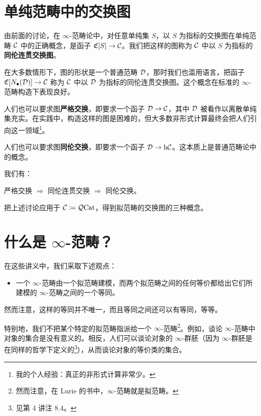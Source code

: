 \section{单纯范畴中的交换图}

\nitem\label{L5-8.1} 由前面的讨论，在 $\infty$-范畴论中，对任意单纯集 $S$，以 $S$ 为指标的交换图在单纯范畴 $\mathcal{C}$ 中的正确概念，是函子 $\mathfrak{C}[S]\to\mathcal{C}$。我们把这样的图称为 $\mathcal{C}$ 中以 $S$ 为指标的\textbf{同伦连贯交换图}。

\nitem\label{L5-8.2} 在大多数情形下，图的形状是一个普通范畴 $\mathcal{D}$，那时我们也滥用语言，把函子 $\mathfrak{C}[N_{\bullet}(\mathcal{D})]\to\mathcal{C}$ 称为 $\mathcal{C}$ 中以 $\mathcal{D}$ 为指标的同伦连贯交换图。这个概念在标准的 $\infty$-范畴构造下表现良好。

人们也可以要求图\textbf{严格交换}，即要求一个函子 $\mathcal{D}\to\mathcal{C}$，其中 $\mathcal{D}$ 被看作以离散单纯集充实。在实践中，构造这样的图是困难的，但大多数非形式计算最终会把人们引向这一领域\footnote{我的个人经验：真正的非形式计算非常少。}。

人们也可以要求图\textbf{同伦交换}，即要求一个函子 $\mathcal{D}\to\mathrm{h}\mathcal{C}$。这本质上是普通范畴论中的概念。

\nitem\label{L5-8.3} 我们有：
\begin{center}
严格交换 $\Rightarrow$ 同伦连贯交换 $\Rightarrow$ 同伦交换。
\end{center}

\begin{exercise}\label{L5-8.4}
把上述讨论应用于 $\mathcal{C}\coloneqq\mathcal{Q}\mathrm{Cat}$，得到拟范畴的交换图的三种概念。
\end{exercise}

\section{什么是 $\infty$-范畴？}

\nitem\label{L5-9.1} 在这些讲义中，我们采取下述观点：
\begin{itemize}[leftmargin=2.2em,itemsep=0.1em]
\item 一个 $\infty$-范畴由一个拟范畴建模，而两个拟范畴之间的任何等价都给出它们所建模的 $\infty$-范畴之间的一个等同。
\end{itemize}
然而注意，这样的等同并不唯一，而且等同之间还可以有等同，等等。

特别地，我们不把某个特定的拟范畴指派给一个 $\infty$-范畴\footnote{然而注意，在 Lurie 的书中，$\infty$-范畴就是拟范畴。}。例如，谈论 $\infty$-范畴中对象的集合是没有意义的。相反，人们可以谈论对象的 $\infty$-群胚（因为 $\infty$-群胚是在同样的哲学下定义的\footnote{见第 4 讲注 8.4。}），从而谈论对象的等价类的集合。

